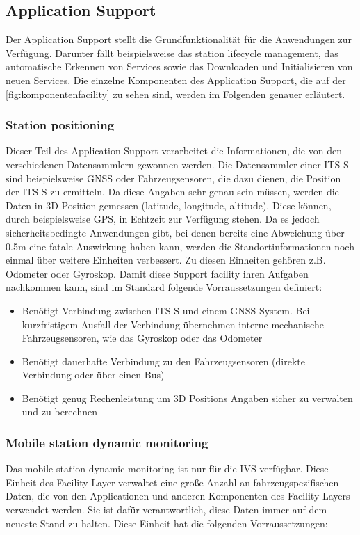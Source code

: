 \subsection{Application Support}
Der Application Support stellt die Grundfunktionalität für die Anwendungen zur Ver\-fü\-gung. Darunter fällt beispielsweise das station lifecycle management, das automatische Erkennen von Services sowie das Downloaden und Initialisieren von neuen Services. Die einzelne Komponenten des Application Support, die auf der \autoref{fig:komponentenfacility} zu sehen sind, werden im Folgenden genauer erläutert. 

\subsubsection{Station positioning}
Dieser Teil des Application Support verarbeitet die Informationen, die von den verschiedenen Datensammlern gewonnen werden. Die Datensammler einer \ac{ITS-S} sind beispielsweise GNSS oder Fahrzeugsensoren, die dazu dienen, die Position der \ac{ITS-S} zu ermitteln. 
Da diese Angaben sehr genau sein müssen, werden die Daten in 3D Position gemessen (latitude, longitude, altitude). Diese können, durch beispielsweise GPS, in Echtzeit zur Verfügung stehen. Da es jedoch sicherheitsbedingte Anwendungen gibt, bei denen bereits eine Abweichung über 0.5m eine fatale Auswirkung haben kann, werden die Standortinformationen noch einmal über weitere Einheiten verbessert. Zu diesen Einheiten gehören z.B. Odometer oder Gyroskop.
Damit diese Support facility ihren Aufgaben nachkommen kann, sind im Standard \cite{etsi102638} folgende Vorraussetzungen definiert:

\begin{itemize}
	\item Benötigt Verbindung zwischen \ac{ITS-S} und einem GNSS System. Bei kurzfristigem Ausfall der Verbindung übernehmen interne mechanische Fahrzeugsensoren, wie das Gyroskop oder das Odometer
	\item Benötigt dauerhafte Verbindung zu den Fahrzeugsensoren (direkte Verbindung oder über einen Bus)
	\item Benötigt genug Rechenleistung um 3D Positions Angaben sicher zu verwalten und zu berechnen
\end{itemize}

\subsubsection{Mobile station dynamic monitoring}
Das mobile station dynamic monitoring ist nur für die \ac{IVS} verfügbar. Diese Einheit des Facility Layer verwaltet eine große Anzahl an fahrzeugspezifischen Daten, die von den Applicationen und anderen Komponenten des Facility Layers verwendet werden. Sie ist dafür verantwortlich, diese Daten immer auf dem neueste  Stand zu halten. 
Diese Einheit hat die folgenden Vorraussetzungen:

